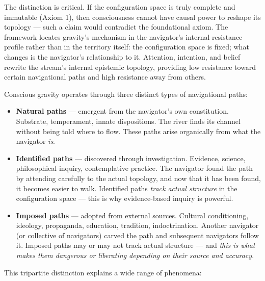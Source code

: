 The distinction is critical. If the configuration space is truly complete and immutable (Axiom 1), then consciousness cannot have causal power to reshape its topology — such a claim would contradict the foundational axiom. The framework locates gravity's mechanism in the navigator's internal resistance profile rather than in the territory itself: the configuration space is fixed; what changes is the navigator's relationship to it. Attention, intention, and belief rewrite the stream's internal epistemic topology, providing low resistance toward certain navigational paths and high resistance away from others.


Conscious gravity operates through three distinct types of navigational paths:


\begin{itemize}[nosep,leftmargin=*]
  \item \textbf{Natural paths} — emergent from the navigator's own constitution. Substrate, temperament, innate dispositions. The river finds its channel without being told where to flow. These paths arise organically from what the navigator \textit{is}.
  \item \textbf{Identified paths} — discovered through investigation. Evidence, science, philosophical inquiry, contemplative practice. The navigator found the path by attending carefully to the actual topology, and now that it has been found, it becomes easier to walk. Identified paths \textit{track actual structure} in the configuration space — this is why evidence-based inquiry is powerful.
  \item \textbf{Imposed paths} — adopted from external sources. Cultural conditioning, ideology, propaganda, education, tradition, indoctrination. Another navigator (or collective of navigators) carved the path and subsequent navigators follow it. Imposed paths may or may not track actual structure — and \textit{this is what makes them dangerous or liberating depending on their source and accuracy}.
\end{itemize}


This tripartite distinction explains a wide range of phenomena:


